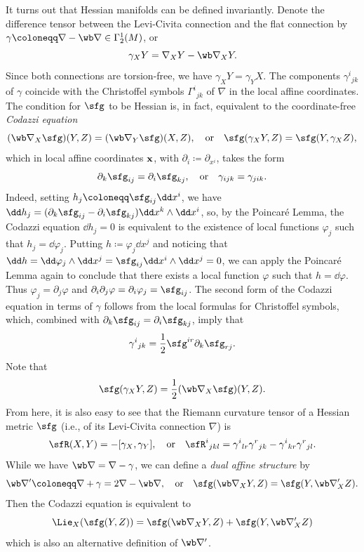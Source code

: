 \begin{example}
    It turns out that Hessian manifolds can be defined invariantly. Denote the difference tensor between the Levi-Civita connection and the flat connection by $\gamma\coloneqq \nabla-\wb\nabla\in \Gamma^1_2(M)$, or 
    \[\gamma_X Y=\nabla_X Y-\wb\nabla_X Y.\] 
    Since both connections are torsion-free, we have 
    $\gamma_X Y=\gamma_Y X$.
    The components $\gamma^i{}_{jk}$ of $\gamma$ coincide with the Christoffel symbols $\varGamma^i{}_{jk}$ of $\nabla$ in the local affine coordinates. The condition for $\sfg$ to be Hessian is, in fact, equivalent to the coordinate-free \emph{Codazzi equation} 
    \[(\wb\nabla_X\sfg)(Y,Z)=(\wb\nabla_Y\sfg)(X,Z),\quad \text{or}\quad \sfg(\gamma_X Y,Z)=\sfg(Y,\gamma_X Z),\]
    which in local affine coordinates $\bf{x}$, with $\partial_i\coloneqq \partial_{x^i}$, takes the form 
    \[\partial_{k}\sfg_{ij}=\partial_{i}\sfg_{kj},\quad \text{or}\quad \gamma_{ijk}=\gamma_{jik}.\]
    Indeed, setting $h_j\coloneqq \sfg_{ij}\dd x^i$, we have $\dd h_j=(\partial_k\sfg_{ij}-\partial_i\sfg_{kj})\dd x^k\wedge\dd x^i$, so, by the Poincar\'e Lemma, the Codazzi equation $\dd h_j=0$ is equivalent to the existence of local functions $\varphi_j$ such that $h_j=\dd\varphi_j$. Putting $h\coloneqq \varphi_j\dd x^j$ and noticing that $\dd h=\dd\varphi_j\wedge\dd x^j=\sfg_{ij}\dd x^i\wedge\dd x^j=0$, we can apply the Poincar\'e Lemma again to conclude that there exists a local function $\varphi$ such that $h=\dd\varphi$. Thus $\varphi_j=\partial_{j}\varphi$ and $\partial_{i}\partial_{j}\varphi=\partial_{i}\varphi_j=\sfg_{ij}$. The second form of the Codazzi equation in terms of $\gamma$ follows from the local formulas for Christoffel symbols, which, combined with $\partial_{k}\sfg_{ij}=\partial_{i}\sfg_{kj}$, imply that 
    \[\gamma^i{}_{jk}=\frac12\sfg^{ir}\partial_k\sfg_{rj}.\]
    Note that 
    \[\sfg(\gamma_X Y,Z)=\frac12(\wb\nabla_X\sfg)(Y,Z).\]
    From here, it is also easy to see that the Riemann curvature tensor of a Hessian metric $\sfg$ (i.e., of its Levi-Civita connection $\nabla$) is 
    \[\sfR(X,Y)=-[\gamma_X,\gamma_Y],\quad\text{or}\quad \sfR^i{}_{jkl}=\gamma^i{}_{lr}\gamma^r{}_{jk}-\gamma^i{}_{kr}\gamma^r{}_{jl}.\]
    While we have $\wb\nabla=\nabla-\gamma$, we can define a \emph{dual affine structure} by 
    \[\wb\nabla'\coloneqq \nabla+\gamma=2\nabla-\wb\nabla,\quad \text{or}\quad \sfg(\wb\nabla_X Y,Z)=\sfg(Y,\wb\nabla_X'Z).\]
    Then the Codazzi equation is equivalent to 
    \[\Lie_X(\sfg(Y,Z))=\sfg(\wb\nabla_X Y,Z)+\sfg(Y,\wb\nabla'_X Z)\label{eq 1385}\]
    which is also an alternative definition of $\wb\nabla'$.

\end{example}
